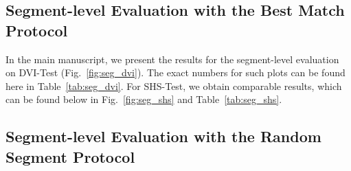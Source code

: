 

\subsection{Segment-level Evaluation with the Best Match Protocol}

In the main manuscript, we present the results for the segment-level evaluation on DVI-Test (Fig.~\ref{fig:seg_dvi}). The exact numbers for such plots can be found here in Table~\ref{tab:seg_dvi}. For SHS-Test, we obtain comparable results, which can be found below in Fig.~\ref{fig:seg_shs} and Table~\ref{tab:seg_shs}.

\subsection{Segment-level Evaluation with the Random Segment Protocol}

